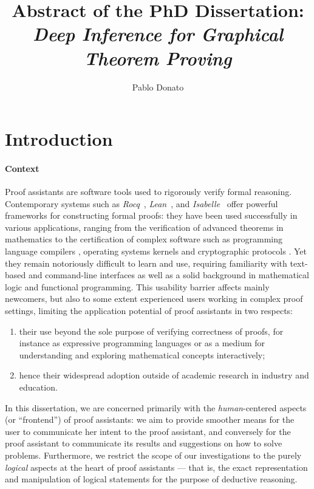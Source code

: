 \documentclass[11pt]{article}
\title{Abstract of the PhD Dissertation: \\ \textit{Deep Inference for Graphical Theorem Proving}}
\author{Pablo Donato}
\date{}
\begin{document}
\maketitle

\section{Introduction}

\paragraph{Context}

Proof assistants are software tools used to rigorously verify formal reasoning. 
Contemporary systems such as \emph{Rocq}~\cite{the_rocq_development_team_2025_15149629}, \emph{Lean}~\cite{10.1007/978-3-030-79876-5_37}, and \emph{Isabelle}~\cite{nipkow2002isabelle} offer powerful frameworks for constructing formal proofs: they have been used successfully in various applications, ranging from the verification of advanced theorems in mathematics \cite{gonthierFormalProofFour2008,halesFormalProofKepler2024,commelinAbstractionBoundariesSpec2023} to the certification of complex software such as programming language compilers \cite{leroyFormalVerificationRealistic2009}, operating systems kernels \cite{kleinSeL4FormalVerification2009} and cryptographic protocols \cite{Barthe2014,wallezComparseProvablySecure2023}. Yet they remain notoriously difficult to learn and use, requiring familiarity with text-based and command-line interfaces as well as a solid background in mathematical logic and functional programming. This usability barrier affects mainly newcomers, but also to some extent experienced users working in complex proof settings, limiting the application potential of proof assistants in two respects:
\begin{enumerate}
    \item their use beyond the sole purpose of verifying correctness of proofs, for instance as expressive programming languages or as a medium for understanding and exploring mathematical concepts interactively;
    \item hence their widespread adoption outside of academic research in industry and education.
\end{enumerate}

In this dissertation, we are concerned primarily with the \emph{human}-centered aspects (or ``frontend'') of proof assistants: we aim to provide smoother means for the user to communicate her intent to the proof assistant, and conversely for the proof assistant to communicate its results and suggestions on how to solve problems. Furthermore, we restrict the scope of our investigations to the purely \emph{logical} aspects at the heart of proof assistants --- that is, the exact representation and manipulation of logical statements for the purpose of deductive reasoning.
\end{document}
